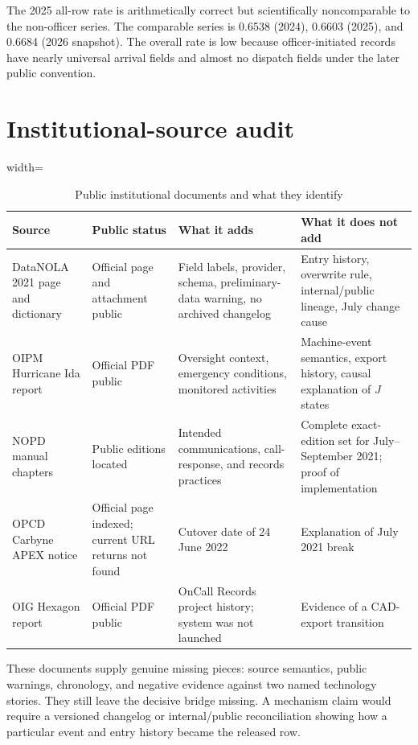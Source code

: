 \documentclass[11pt]{article}
\begin{document}
The 2025 all-row rate is arithmetically correct but scientifically noncomparable to the non-officer series. The comparable series is 0.6538 (2024), 0.6603 (2025), and 0.6684 (2026 snapshot). The overall rate is low because officer-initiated records have nearly universal arrival fields and almost no dispatch fields under the later public convention.

\section{Institutional-source audit}

\begin{table}[!htbp]
\centering
\caption{Public institutional documents and what they identify}
\label{tab:institutions}
\begin{adjustbox}{width=\textwidth}
\begin{tabular}{@{}p{}p{}p{}p{}@{}}
\toprule
Source & Public status & What it adds & What it does not add \\
\midrule
DataNOLA 2021 page and dictionary & Official page and attachment public & Field labels, provider, schema, preliminary-data warning, no archived changelog & Entry history, overwrite rule, internal/public lineage, July change cause \\
OIPM Hurricane Ida report & Official PDF public & Oversight context, emergency conditions, monitored activities & Machine-event semantics, export history, causal explanation of $J$ states \\
NOPD manual chapters & Public editions located & Intended communications, call-response, and records practices & Complete exact-edition set for July--September 2021; proof of implementation \\
OPCD Carbyne APEX notice & Official page indexed; current URL returns not found & Cutover date of 24 June 2022 & Explanation of July 2021 break \\
OIG Hexagon report & Official PDF public & OnCall Records project history; system was not launched & Evidence of a CAD-export transition \\
\bottomrule
\end{tabular}
\end{adjustbox}
\end{table}

These documents supply genuine missing pieces: source semantics, public warnings, chronology, and negative evidence against two named technology stories. They still leave the decisive bridge missing. A mechanism claim would require a versioned changelog or internal/public reconciliation showing how a particular event and entry history became the released row.
\end{document}
